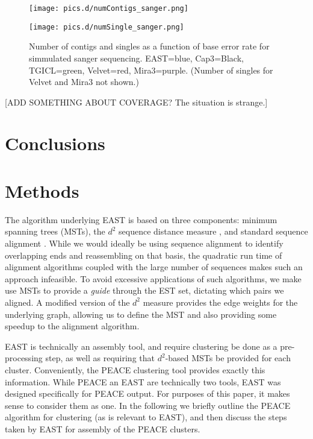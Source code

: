 \documentclass[10pt]{bmc_article}
\newcommand{\peace} {{\small PEACE}}
\newcommand{\capthree} {{\small Cap3}}
\newcommand{\tgicl} {{\small TGICL}}
\newcommand{\east} {{\small EAST}}
\newcommand{\velvet}{{\small Velvet}}
\newcommand{\mira}{{\small Mira3}}
\newenvironment{bmcformat}{\begin{raggedright}\baselineskip20pt\sloppy\setboolean{publ}{false}}{\end{raggedright}\baselineskip20pt\sloppy}
\begin{document}
\begin{bmcformat}
\begin{figure}[htb]
\begin{minipage}{3in}
\texttt{[image: pics.d/numContigs\_sanger.png]}
\end{minipage}
\begin{minipage}{3in}
\texttt{[image: pics.d/numSingle\_sanger.png]}
\end{minipage}
\label{contigs.sanger}
\caption{Number of contigs and singles as a function of base error
  rate for simmulated sanger sequencing.  \east=blue, \capthree=Black,
  \tgicl=green, \velvet=red, \mira=purple.  (Number of singles for
  \velvet\/ and \mira\/ not shown.)}
\end{figure}

[ADD SOMETHING ABOUT COVERAGE?  The situation is strange.]









\section*{Conclusions}


  
\section*{Methods}

The algorithm underlying \east\/ is based on three components: minimum
spanning trees (MSTs)\cite{Prim57}, the $d^2$ sequence distance
measure \cite{Hide94}, and standard sequence alignment
\cite{Needleman70,Smith81}.  While we would ideally be using sequence
alignment to identify overlapping ends and reassembling on that basis,
the quadratic run time of alignment algorithms coupled with the large
number of sequences makes such an approach infeasible.  To avoid excessive
applications of such algorithms, we make use MSTs to provide a {\it
  guide} through the EST set, dictating which pairs we aligned.  A
modified version of the $d^2$ measure provides the edge weights for
the underlying graph, allowing us to define the MST and also providing
some speedup to the alignment algorithm.

\east\/ is technically an assembly tool, and require clustering be
done as a pre-processing step, as well as requiring that $d^2$-based
MSTs be provided for each cluster.  Conveniently, the \peace\/
clustering tool \cite{Rao10} provides exactly this information.  While
\peace\/ an \east\/ are technically two tools, \east\/ was designed
specifically for \peace\/ output.  For purposes of this paper, it
makes sense to consider them as one.  In the following we briefly
outline the \peace\/ algorithm for clustering (as is relevant to
\east\/), and then discuss the steps taken by \east\/ for assembly of
the \peace\/ clusters.


\end{bmcformat}
\end{document}
